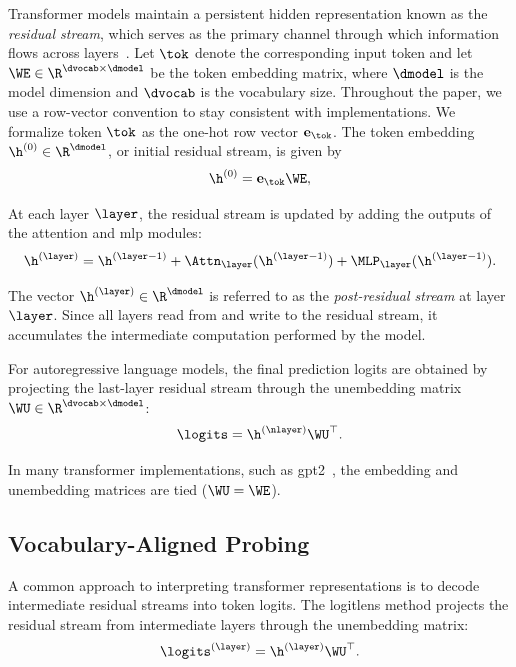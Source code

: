 \documentclass{article}
\begin{document}
Transformer models maintain a persistent hidden representation known as the \textit{residual stream}, which serves as the primary channel through which information flows across layers~\cite{vaswaniAttentionAllYou2017}. Let $\tok$ denote the corresponding input token and let $\WE \in \R^{\dvocab \times \dmodel}$ be the token embedding matrix, where $\dmodel$ is the model dimension and $\dvocab$ is the vocabulary size. Throughout the paper, we use a row-vector convention to stay consistent with implementations. We formalize token $\tok$ as the one-hot row vector $\mathbf{e}_{\tok}$. The token embedding $\h^{(0)} \in \R^{\dmodel}$, or initial residual stream, is given by
\begin{equation}
  \h^{(0)} = \mathbf{e}_{\tok} \WE,
\end{equation}


At each layer $\layer$, the residual stream is updated by adding the outputs of the attention and \gls{mlp} modules:
\begin{equation}
  \h^{(\layer)} = \h^{(\layer-1)} + \Attn_{\layer}(\h^{(\layer-1)}) + \MLP_{\layer}(\h^{(\layer-1)}).
\end{equation}

The vector $\h^{(\layer)} \in \R^{\dmodel}$ is referred to as the \textit{post-residual stream} at layer $\layer$. Since all layers read from and write to the residual stream, it accumulates the intermediate computation performed by the model.

For autoregressive language models, the final prediction logits are obtained by projecting the last-layer residual stream through the unembedding matrix $\WU \in \R^{\dvocab \times \dmodel}$:
\begin{equation}
  \logits = \h^{(\nlayer)} \WU^\top .
\end{equation}

In many transformer implementations, such as \gls{gpt2}~\cite{radfordLanguageModelsAre2019}, the embedding and unembedding matrices are tied ($\WU = \WE$). 

\subsection{Vocabulary-Aligned Probing}

A common approach to interpreting transformer representations is to decode intermediate residual streams into token logits. The \gls{logitlens} method projects the residual stream from intermediate layers through the unembedding matrix:
\begin{equation}
  \logits^{(\layer)} = \h^{(\layer)} \WU^\top .
\end{equation}
\end{document}
